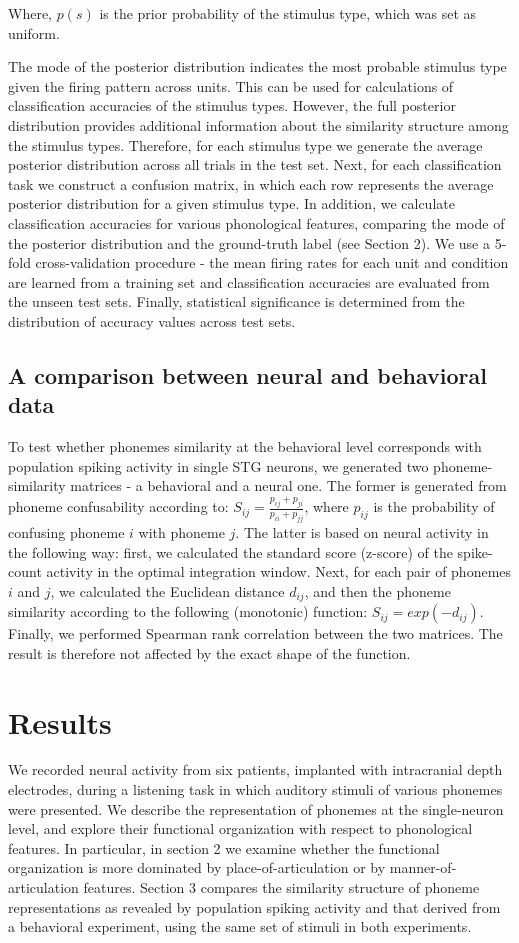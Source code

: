 Where, $p(s)$ is the prior probability of the stimulus type, which was set as uniform.

The mode of the posterior distribution indicates the most probable stimulus type given the firing pattern across units. This can be used for calculations of classification accuracies of the stimulus types. However, the full posterior distribution provides additional information about the similarity structure among the stimulus types. Therefore, for each stimulus type we generate the average posterior distribution across all trials in the test set. Next, for each classification task we construct a confusion matrix, in which each row represents the average posterior distribution for a given stimulus type. In addition, we calculate classification accuracies for various phonological features, comparing the mode of the posterior distribution and the ground-truth label (see Section 2). We use a 5-fold cross-validation procedure - the mean firing rates for each unit and condition are learned from a training set and classification accuracies are evaluated from the unseen test sets. Finally, statistical significance is determined from the distribution of accuracy values across test sets.


\subsection{A comparison between neural and behavioral data}
To test whether phonemes similarity at the behavioral level corresponds with population spiking activity in single STG neurons, we generated two phoneme-similarity matrices - a behavioral and a neural one. The former is generated from phoneme confusability according to: $S_{ij}=\frac{p_{ij}+p_{ji}}{p_{ii}+p_{jj}}$, where $p_{ij}$ is the probability of confusing phoneme $i$ with phoneme $j$. The latter is based on neural activity in the following way: first, we calculated the standard score (z-score) of the spike-count activity in the optimal integration window. Next, for each pair of phonemes $i$ and $j$, we calculated the Euclidean distance $d_{ij}$, and then the phoneme similarity according to the following (monotonic) function: $S_{ij}=exp(-d_{ij})$. Finally, we performed Spearman rank correlation between the two matrices. The result is therefore not affected by the exact shape of the function. 

\section{Results}
We recorded neural activity from six patients, implanted with intracranial depth electrodes, during a listening task in which auditory stimuli of various phonemes were presented. We describe the representation of phonemes at the single-neuron level, and explore their functional organization with respect to phonological features. In particular, in section 2 we examine whether the functional organization is more dominated by place-of-articulation or by manner-of-articulation features. Section 3 compares the similarity structure of phoneme representations as revealed by population spiking activity and that derived from a behavioral experiment, using the same set of stimuli in both experiments.


